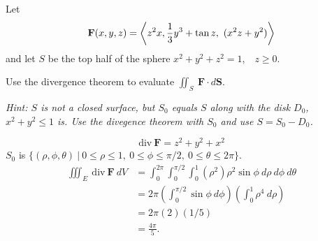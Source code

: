\documentclass[12pt]{exam}
\newcommand{\mbf}{\mathbf{F}}
\newcommand{\intfs}{\iint_S~\mbf\cdot d\bm{S}}
\newcommand{\intdiv}{\iiint_E~\mathrm{div}~\mbf~dV}
\begin{document}
\begin{questions}
\newpage 

\question Let 
    \[
        \mbf(x,y,z)=\gen{z^2x,\frac{1}{3}y^3+\tan z,~(x^2z+y^2)}
    \] 
    and let 
    \(S\) be the top half of the sphere \(x^2+y^2+z^2=1,\) 
    ~\(z\ge 0\). 

    Use the divergence theorem to evaluate \(\intfs\).
    
    \emph{Hint: \(S\) is not a closed surface, but \(S_0\) equals \(S\) along with the disk \(D_0\), \(x^2+y^2\le 1\) is. Use the divegence theorem with \(S_0\) and use \(S=S_0-D_0\).}
    \ifprintanswers
        \begin{solution}
            \[
                \mathrm{div}~\mbf = z^2+y^2+x^2
            \]
            \(S_0\) is \(\{(\rho,\phi,\theta)~|~0\le\rho\le 1,~0\le\phi\le\pi/2,~0\le\theta\le 2\pi\}\).
            \begin{align*}
                \intdiv & = \int_0^{2\pi}\int_0^{\pi/2}\int_0^1(\rho^2)\rho^2\sin\phi~d\rho~d\phi~d\theta\\
                & = 2\pi\left(\int_0^{\pi/2}\sin\phi~d\phi\right)\left(\int_0^1\rho^{4}~d\rho\right)\\
                & = 2\pi\left(2\right)\left(1/5\right)\\
                & = \frac{4\pi}{5}.
            \end{align*}
            
        \end{solution}
    \else
        \vfill
    \fi


\end{questions}
\end{document}
